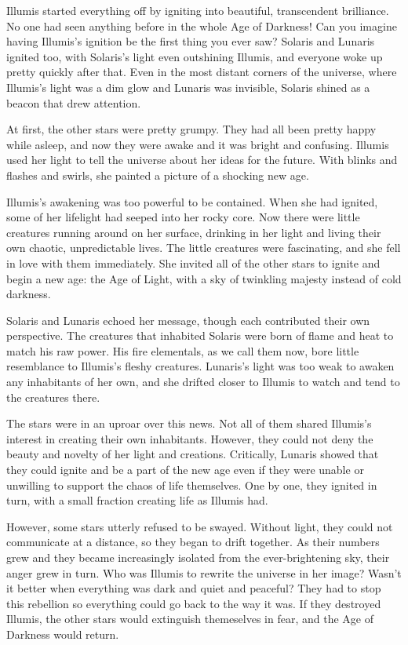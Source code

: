   Illumis started everything off by igniting into beautiful, transcendent brilliance.
  No one had seen anything before in the whole Age of Darkness!
  Can you imagine having Illumis's ignition be the first thing you ever saw?
  Solaris and Lunaris ignited too, with Solaris's light even outshining Illumis, and everyone woke up pretty quickly after that.
  Even in the most distant corners of the universe, where Illumis's light was a dim glow and Lunaris was invisible, Solaris shined as a beacon that drew attention.

  At first, the other stars were pretty grumpy.
  They had all been pretty happy while asleep, and now they were awake and it was bright and confusing.
  Illumis used her light to tell the universe about her ideas for the future.
  With blinks and flashes and swirls, she painted a picture of a shocking new age.

  Illumis's awakening was too powerful to be contained.
  When she had ignited, some of her lifelight had seeped into her rocky core.
  Now there were little creatures running around on her surface, drinking in her light and living their own chaotic, unpredictable lives.
  The little creatures were fascinating, and she fell in love with them immediately.
  She invited all of the other stars to ignite and begin a new age: the Age of Light, with a sky of twinkling majesty instead of cold darkness.

  Solaris and Lunaris echoed her message, though each contributed their own perspective.
  The creatures that inhabited Solaris were born of flame and heat to match his raw power.
  His fire elementals, as we call them now, bore little resemblance to Illumis's fleshy creatures.
  Lunaris's light was too weak to awaken any inhabitants of her own, and she drifted closer to Illumis to watch and tend to the creatures there.

  The stars were in an uproar over this news.
  Not all of them shared Illumis's interest in creating their own inhabitants.
  However, they could not deny the beauty and novelty of her light and creations.
  Critically, Lunaris showed that they could ignite and be a part of the new age even if they were unable or unwilling to support the chaos of life themselves.
  One by one, they ignited in turn, with a small fraction creating life as Illumis had.

  However, some stars utterly refused to be swayed.
  Without light, they could not communicate at a distance, so they began to drift together.
  As their numbers grew and they became increasingly isolated from the ever-brightening sky, their anger grew in turn.
  Who was Illumis to rewrite the universe in her image?
  Wasn't it better when everything was dark and quiet and peaceful?
  They had to stop this rebellion so everything could go back to the way it was.
  If they destroyed Illumis, the other stars would extinguish themeselves in fear, and the Age of Darkness would return.

